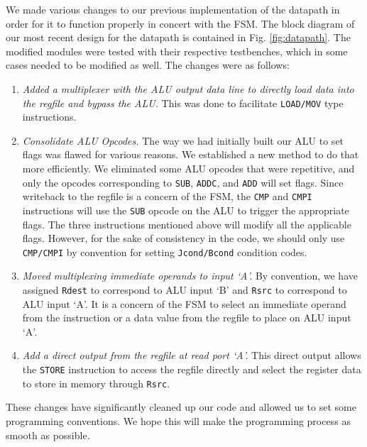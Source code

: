 \documentclass[conference]{IEEEtran}
\begin{document}
We made various changes to our previous implementation of the datapath in order for it to function properly in concert with the FSM. The block diagram of our most recent design for the datapath is contained in Fig. \ref{fig:datapath}. The modified modules were tested with their respective testbenches, which in some cases needed to be modified as well. The changes were as follows:
\begin{enumerate}
    \item \textit{Added a multiplexer with the ALU output data line to directly load data into the regfile and bypass the ALU.} This was done to facilitate \verb|LOAD/MOV| type instructions.
    \item \textit{Consolidate ALU Opcodes.} The way we had initially built our ALU to set flags was flawed for various reasons. We established a new method to do that more efficiently. We eliminated some ALU opcodes that were repetitive, and only the opcodes corresponding to \verb|SUB|, \verb|ADDC|, and \verb|ADD| will set flags. Since writeback to the regfile is a concern of the FSM, the \verb|CMP| and \verb|CMPI| instructions will use the \verb|SUB| opcode on the ALU to trigger the appropriate flags. The three instructions mentioned above will modify all the applicable flags. However, for the sake of consistency in the code, we should only use \verb|CMP/CMPI| by convention for setting \verb|Jcond/Bcond| condition codes.
    \item \textit{Moved multiplexing immediate operands to input `A'.} By convention, we have assigned \verb|Rdest| to correspond to ALU input `B' and \verb|Rsrc| to correspond to ALU input `A'. It is a concern of the FSM to select an immediate operand from the instruction or a data value from the regfile to place on ALU input `A'.
    \item \textit{Add a direct output from the regfile at read port `A'.} This direct output allows the \verb|STORE| instruction to access the regfile directly and select the register data to store in memory through \verb|Rsrc|.
\end{enumerate}

These changes have significantly cleaned up our code and allowed us to set some programming conventions. We hope this will make the programming process as smooth as possible.
\end{document}
